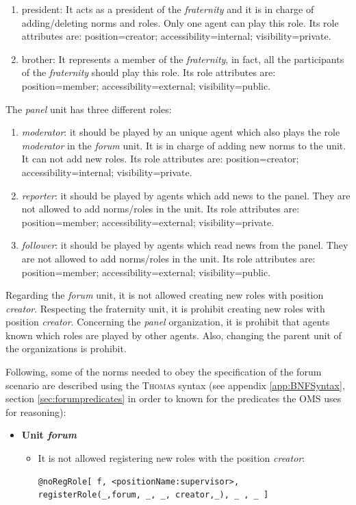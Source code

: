 \begin{enumerate}
\begin{enumerate}
\item president: It acts as a president of the \textit{fraternity} and it is in  charge of adding/deleting norms and roles.  Only one agent can play this role. Its role attributes are: position=creator; accessibility=internal; visibility=private.
\item brother: It represents a member of the \textit{fraternity}, in fact, all the participants of the \textit{fraternity} should play this role.  Its role attributes are: position=member; accessibility=external; visibility=public.
\end{enumerate}

The \textit{panel} unit has three different roles:
\begin{enumerate}
\item \textit{moderator}: it should be played by an unique agent which also plays the role \textit{moderator} in the \textit{forum} unit. It is in charge of adding new norms to the unit. It can not add new roles. Its role attributes are: position=creator; accessibility=internal; visibility=private.
\item \textit{reporter}: it should be played by agents which add news to the panel. They are not allowed to add norms/roles in the unit. Its role attributes are: position=member; accessibility=external; visibility=private.
\item \textit{follower}: it should be played by agents which read news from the panel.  They are not allowed to add norms/roles in the unit. Its role attributes are: position=member; accessibility=external; visibility=public.
\end{enumerate}

Regarding the \textit{forum} unit, it is not allowed creating new roles with position \textit{creator}.  Respecting the fraternity unit, it is prohibit  creating new roles with position \textit{creator}. Concerning   the \textit{panel} organization, it is prohibit that agents known which roles are played by other agents. Also,  changing the parent unit of the organizations is prohibit.   

Following,  some of the norms needed to obey the specification of the forum scenario are described using the \textsc{Thomas} syntax (see appendix \ref{app:BNFSyntax}, section \ref{sec:forumpredicates} in order to known for the predicates  the OMS uses for reasoning):
\begin{itemize}
\item \textbf{Unit \textit{forum}}
\begin{itemize}
\item It is not allowed registering new roles with the position \textit{creator}:
\begin{verbatim}
@noRegRole[ f, <positionName:supervisor>, 
registerRole(_,forum, _, _, creator,_), _ , _ ] 
\end{verbatim}


\end{itemize}
\end{itemize}
\end{enumerate}
